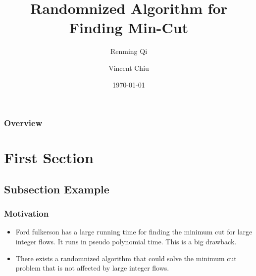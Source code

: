 \documentclass{beamer}
\title[Randomnized Algorithm]{Randomnized Algorithm for Finding Min-Cut } %
\author{Renming Qi \and Vincent Chiu} %
\date{\today} %
\begin{document}
\begin{frame}
\titlepage %
\end{frame}

\begin{frame}
\frametitle{Overview} %
\tableofcontents %
\end{frame}


\section{First Section} %

\subsection{Subsection Example} %




\begin{frame}
\frametitle{Motivation}
\begin{itemize}
	\item Ford fulkerson has a large running time for finding the minimum cut for large integer flows. It runs in pseudo polynomial time.  This is a big drawback.
	\item There exists a randomnized algorithm that could solve the minimum cut problem that is not affected by large integer flows.
\end{itemize}


\end{frame}
\end{document}

